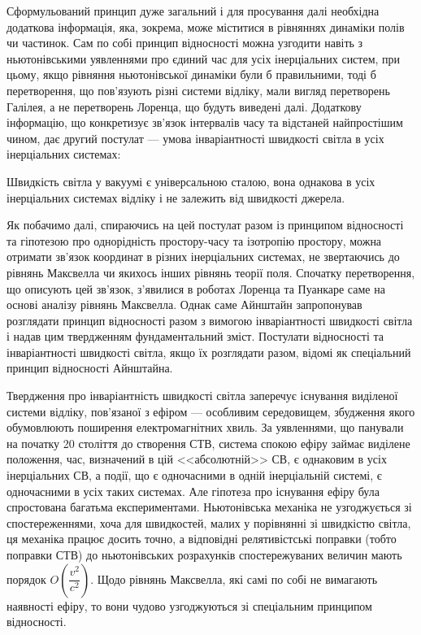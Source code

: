Сформульований принцип дуже загальний і для просування далі необхідна додаткова інформація, яка, зокрема, може міститися
в рівняннях динаміки полів чи частинок. Сам по собі принцип відносності можна узгодити навіть з ньютонівськими
уявленнями про єдиний час для усіх інерціальних систем, при цьому, якщо рівняння ньютонівської динаміки були б
правильними, тоді б перетворення, що пов'язують різні системи відліку, мали вигляд перетворень Галілея, а не перетворень
Лоренца, що будуть виведені далі. Додаткову інформацію, що конкретизує зв'язок інтервалів часу та відстаней найпростішим
чином, дає другий постулат --- умова інваріантності швидкості світла в усіх інерціальних системах:

\begin{postulate}{}
    Швидкість світла у вакуумі є універсальною сталою, вона однакова в усіх інерціальних системах відліку і не залежить
    від швидкості джерела.
\end{postulate}


Як побачимо далі, спираючись на цей постулат разом із принципом відносності та гіпотезою про однорідність простору-часу
та ізотропію простору, можна отримати зв'язок координат в різних інерціальних системах, не звертаючись до рівнянь
Максвелла чи якихось інших рівнянь теорії поля. Спочатку перетворення, що описують цей зв'язок, з'явилися в роботах
Лоренца та Пуанкаре саме на основі аналізу рівнянь Максвелла. Однак саме Айнштайн запропонував розглядати принцип
відносності разом з вимогою інваріантності швидкості світла і надав цим твердженням фундаментальний зміст. Постулати
відносності та інваріантності швидкості світла, якщо їх розглядати разом, відомі як спеціальний принцип відносності
Айнштайна.

Твердження про інваріантність швидкості світла заперечує існування виділеної системи відліку, пов'язаної з ефіром ---
особливим середовищем, збудження якого обумовлюють поширення електромагнітних хвиль. За уявленнями, що панували на
початку 20 століття до створення СТВ, система спокою ефіру займає виділене положення, час, визначений в цій
<<абсолютній>> СВ, є однаковим в усіх інерціальних СВ, а події, що є одночасними в одній інерціальній системі, є
одночасними в усіх таких системах. Але гіпотеза про існування ефіру була спростована багатьма експериментами.
Ньютонівська механіка не узгоджується зі спостереженнями, хоча для швидкостей, малих у порівнянні зі швидкістю світла,
ця механіка працює досить точно, а відповідні релятивістські поправки (тобто поправки СТВ) до ньютонівських розрахунків
спостережуваних величин мають порядок $O\left(\dfrac{v^2}{c^2}\right)$. Щодо рівнянь Максвелла, які самі по собі не
вимагають наявності ефіру, то вони чудово узгоджуються зі спеціальним принципом відносності.


